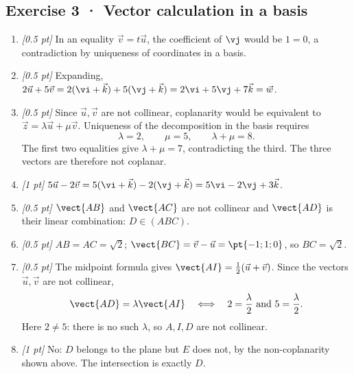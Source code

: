 \subsection*{Exercise 3 · Vector calculation in a basis}\begin{enumerate}

\item \textit{[0.5 pt]} In an equality $\vec v=t\vec u$, the coefficient of $\vj $ would be $1=0$, a contradiction by uniqueness of coordinates in a basis.

\item \textit{[0.5 pt]} Expanding, $2\vec u+5\vec v=2(\vi +\vec k)+5(\vj +\vec k)=2\vi +5\vj +7\vec k=\vec w$.

\item \textit{[0.5 pt]} Since $\vec u,\vec v$ are not collinear, coplanarity would be equivalent to $\vec z=\lambda\vec u+\mu\vec v$. Uniqueness of the decomposition in the basis requires
\[\lambda=2,\qquad\mu=5,\qquad\lambda+\mu=8.\]
The first two equalities give $\lambda+\mu=7$, contradicting the third. The three vectors are therefore not coplanar.

\item \textit{[1 pt]} $5\vec u-2\vec v=5(\vi +\vec k)-2(\vj +\vec k)=5\vi -2\vj +3\vec k$.

\item \textit{[0.5 pt]} $\vect{AB}$ and $\vect{AC}$ are not collinear and $\vect{AD}$ is their linear combination: $D\in(ABC)$.

\item \textit{[0.5 pt]} $AB=AC=\sqrt2$; $\vect{BC}=\vec v-\vec u=\pt{-1;1;0}$, so $BC=\sqrt2$.

\item \textit{[0.5 pt]} The midpoint formula gives $\vect{AI}=\frac12(\vec u+\vec v)$. Since the vectors $\vec u,\vec v$ are not collinear,
\[\vect{AD}=\lambda\vect{AI}\quad\Longleftrightarrow\quad 2=\frac{\lambda}{2}\ \text{and}\ 5=\frac{\lambda}{2}.\]
Here $2\ne 5$: there is no such $\lambda$, so $A,I,D$ are not collinear.

\item \textit{[1 pt]} No: $D$ belongs to the plane but $E$ does not, by the non-coplanarity shown above. The intersection is exactly $D$.

\end{enumerate}

